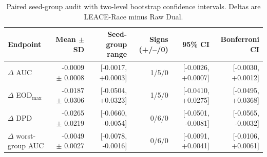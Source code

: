 \begin{table}[htbp]
\centering
\small
\caption{Paired seed-group audit with two-level bootstrap confidence intervals. Deltas are LEACE-Race minus Raw Dual.}
\label{tab:seed-paired-audit}
\begin{tabular}{lrrrrr}
\toprule
Endpoint & Mean $\pm$ SD & Seed-group range & Signs (+/--/0) & 95\% CI & Bonferroni CI \\
\midrule
$\Delta$ AUC & -0.0009 $\pm$ 0.0008 & [-0.0017, +0.0003] & 1/5/0 & [-0.0026, +0.0007] & [-0.0030, +0.0012] \\
$\Delta$ EOD$_{\max}$ & -0.0187 $\pm$ 0.0306 & [-0.0504, +0.0323] & 1/5/0 & [-0.0410, +0.0275] & [-0.0495, +0.0368] \\
$\Delta$ DPD & -0.0265 $\pm$ 0.0219 & [-0.0660, -0.0054] & 0/6/0 & [-0.0501, -0.0081] & [-0.0565, -0.0032] \\
$\Delta$ worst-group AUC & -0.0049 $\pm$ 0.0027 & [-0.0078, -0.0016] & 0/6/0 & [-0.0091, +0.0041] & [-0.0106, +0.0061] \\
\bottomrule
\end{tabular}
\end{table}
